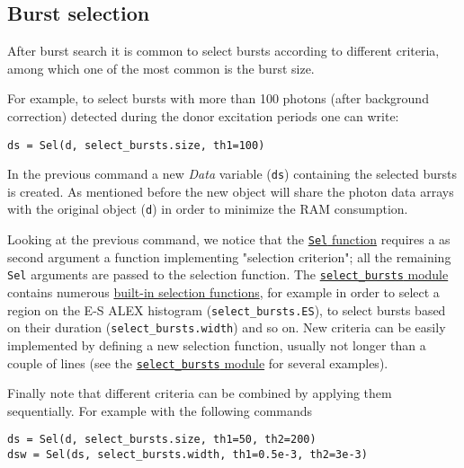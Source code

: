 \subsection{Burst selection}
\label{sec:burstsel}

After burst search it is common to select bursts according to different
criteria, among which one of the most common is the burst size.

For example, to select bursts with more than 100 photons (after background
correction) detected during the donor excitation periods one can write:

\begin{verbatim}
ds = Sel(d, select_bursts.size, th1=100)
\end{verbatim}

In the previous command a new \textit{Data} variable (\verb|ds|) containing the selected
bursts is created. As mentioned before the new object will share the photon data
arrays with the original object (\verb|d|) in order to minimize the RAM
consumption.

Looking at the previous command, we notice that the
\href{http://fretbursts.readthedocs.org/en/latest/burst\_selection.html#fretbursts.burstlib.Sel}{\texttt{Sel} function}
requires a as second argument a function implementing "selection criterion"; all the 
remaining \verb|Sel| arguments are passed to the selection function. The
\href{http://fretbursts.readthedocs.org/en/latest/burst_selection.html}{\texttt{select\_bursts} module} 
contains numerous 
\href{http://fretbursts.readthedocs.org/en/latest/burst_selection.html#module-fretbursts.select_bursts}{built-in selection functions}, 
for example in order to select a region on the E-S ALEX histogram (\verb|select_bursts.ES|), 
to select bursts based on their duration (\verb|select_bursts.width|) and so on.
New criteria can be easily implemented by defining a new selection function, usually 
not longer than a couple of lines (see the
\href{https://github.com/tritemio/FRETBursts/blob/master/fretbursts/select\_bursts.py}{\texttt{select\_bursts} module} for several examples).

Finally note that different criteria can be combined by applying them sequentially. 
For example with the following commands

\begin{verbatim}
ds = Sel(d, select_bursts.size, th1=50, th2=200)
dsw = Sel(ds, select_bursts.width, th1=0.5e-3, th2=3e-3)
\end{verbatim}

